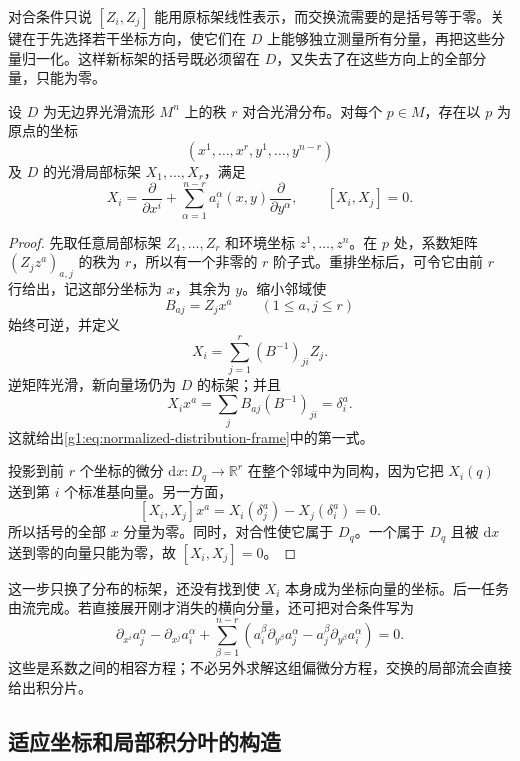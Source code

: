 对合条件只说 \([Z_i,Z_j]\) 能用原标架线性表示，而交换流需要的是括号等于零。关键在于先选择若干坐标方向，使它们在 \(D\) 上能够独立测量所有分量，再把这些分量归一化。这样新标架的括号既必须留在 \(D\)，又失去了在这些方向上的全部分量，只能为零。

\begin{lemma}\label{g1:lem:commuting-distribution-frame}
	设 \(D\) 为无边界光滑流形 \(M^n\) 上的秩 \(r\) 对合光滑分布。对每个 \(p\in M\)，存在以 \(p\) 为原点的坐标
	\[
		(x^1,\ldots,x^r,y^1,\ldots,y^{n-r})
	\]
	及 \(D\) 的光滑局部标架 \(X_1,\ldots,X_r\)，满足
	\begin{equation}\label{g1:eq:normalized-distribution-frame}
		X_i=\frac{\partial}{\partial x^i}
		+\sum_{\alpha=1}^{n-r}a_i^\alpha(x,y)\frac{\partial}{\partial y^\alpha},
		\qquad [X_i,X_j]=0.
	\end{equation}
\end{lemma}
\begin{proof}
	先取任意局部标架 \(Z_1,\ldots,Z_r\) 和环境坐标 \(z^1,\ldots,z^n\)。在 \(p\) 处，系数矩阵 \((Z_jz^a)_{a,j}\) 的秩为 \(r\)，所以有一个非零的 \(r\) 阶子式。重排坐标后，可令它由前 \(r\) 行给出，记这部分坐标为 \(x\)，其余为 \(y\)。缩小邻域使
	\[
		B_{aj}=Z_jx^a\qquad(1\le a,j\le r)
	\]
	始终可逆，并定义
	\[
		X_i=\sum_{j=1}^r(B^{-1})_{ji}Z_j.
	\]
	逆矩阵光滑，新向量场仍为 \(D\) 的标架；并且
	\[
		X_ix^a=\sum_jB_{aj}(B^{-1})_{ji}=\delta_i^a.
	\]
	这就给出\eqref{g1:eq:normalized-distribution-frame}中的第一式。

	投影到前 \(r\) 个坐标的微分 \(\mathrm{d}x:D_q\to\mathbb R^r\) 在整个邻域中为同构，因为它把 \(X_i(q)\) 送到第 \(i\) 个标准基向量。另一方面，
	\[
		[X_i,X_j]x^a=X_i(\delta_j^a)-X_j(\delta_i^a)=0.
	\]
	所以括号的全部 \(x\) 分量为零。同时，对合性使它属于 \(D_q\)。一个属于 \(D_q\) 且被 \(\mathrm{d}x\) 送到零的向量只能为零，故 \([X_i,X_j]=0\)。
\end{proof}

这一步只换了分布的标架，还没有找到使 \(X_i\) 本身成为坐标向量的坐标。后一任务由流完成。若直接展开刚才消失的横向分量，还可把对合条件写为
\[
	\partial_{x^i}a_j^\alpha-\partial_{x^j}a_i^\alpha
	+\sum_{\beta=1}^{n-r}\left(
		a_i^\beta\partial_{y^\beta}a_j^\alpha
		-a_j^\beta\partial_{y^\beta}a_i^\alpha
	\right)=0.
\]
这些是系数之间的相容方程；不必另外求解这组偏微分方程，交换的局部流会直接给出积分片。

\subsection{适应坐标和局部积分叶的构造}
\label{g1:subsec:1304:04}

